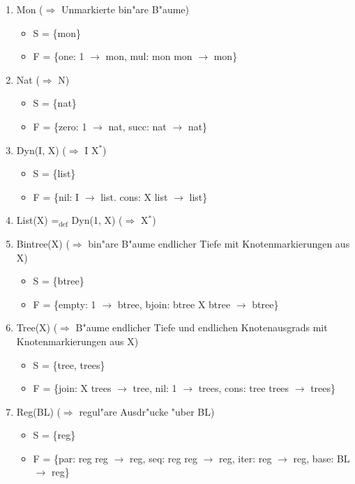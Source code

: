 \documentclass[11pt]{article}
\begin{document}
\begin{enumerate}
\item Mon ($\Rightarrow$ Unmarkierte bin"are B"aume)
\label{sec-2-5-1-1}
\begin{itemize}
\item S = \{mon\}
\item F = \{one: 1 $\to$ mon, mul: mon \texttimes{} mon $\to$ mon\}
\end{itemize}

\item Nat ($\Rightarrow$ N)
\label{sec-2-5-1-2}
\begin{itemize}
\item S = \{nat\}
\item F = \{zero: 1 $\to$ nat, succ: nat $\to$ nat\}
\end{itemize}

\item Dyn(I, X) ($\Rightarrow$ I \texttimes{} X$^{\text{*}}$)
\label{sec-2-5-1-3}
\begin{itemize}
\item S = \{list\}
\item F = \{nil: I $\to$ list. cons: X \texttimes{} list $\to$ list\}
\end{itemize}

\item List(X) =$_{\text{def}}$ Dyn(1, X) ($\Rightarrow$ X$^{\text{*}}$)
\label{sec-2-5-1-4}

\item Bintree(X) ($\Rightarrow$ bin"are B"aume endlicher Tiefe mit Knotenmarkierungen aus X)
\label{sec-2-5-1-5}
\begin{itemize}
\item S = \{btree\}
\item F = \{empty: 1 $\to$ btree, bjoin: btree \texttimes{} X \texttimes{} btree $\to$ btree\}
\end{itemize}


\item Tree(X) ($\Rightarrow$ B"aume endlicher Tiefe und endlichen Knotenausgrads mit Knotenmarkierungen aus X)
\label{sec-2-5-1-6}
\begin{itemize}
\item S = \{tree, trees\}
\item F = \{join: X \texttimes{} trees $\to$ tree, nil: 1 $\to$ trees, cons: tree \texttimes{} trees $\to$ trees\}
\end{itemize}

\item Reg(BL) ($\Rightarrow$ regul"are Ausdr"ucke "uber BL)
\label{sec-2-5-1-7}
\begin{itemize}
\item S = \{reg\}
\item F = \{par: reg \texttimes{} reg $\to$ reg, seq: reg \texttimes{} reg $\to$ reg, iter: reg $\to$ reg, base: BL $\to$ reg\}
\end{itemize}


\end{enumerate}
\end{document}

